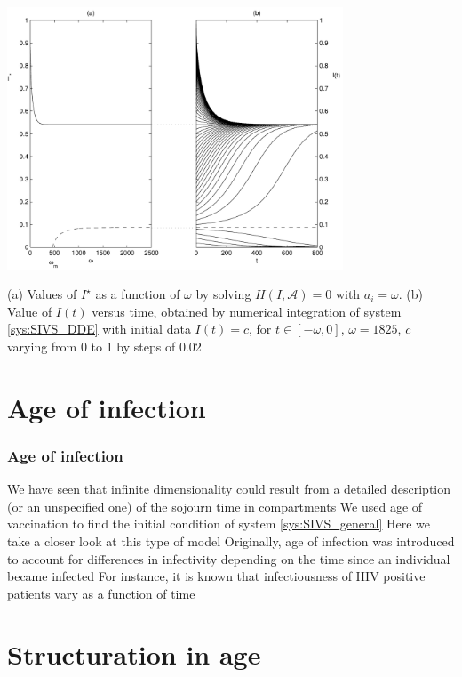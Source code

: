 \documentclass[aspectratio=169]{beamer}\usepackage[]{graphicx}\usepackage[]{xcolor}
\begin{document}
\begin{frame}
\begin{center}
   \includegraphics[width=0.75\textwidth]{FIGS/bif_and_time}
\end{center}
(a) Values of $I^\star$ as a function of $\omega$ by solving $H(I,\mathcal{A})=0$ with $a_i=\omega$. (b) Value of $I(t)$ versus time, obtained by numerical integration of system \eqref{sys:SIVS_DDE} with initial data $I(t)=c$, for $t\in[-\omega,0]$, $\omega=1825$, $c$ varying from 0 to 1 by steps of 0.02
\end{frame}


\section{Age of infection}

\begin{frame}\frametitle{Age of infection}
We have seen that infinite dimensionality could result from a detailed description (or an unspecified one) of the sojourn time in compartments
\vfill
We used age of vaccination to find the initial condition of system \eqref{sys:SIVS_general}
\vfill
Here we take a closer look at this type of model
\vfill
Originally, age of infection was introduced to account for differences in infectivity depending on the time since an individual became infected
\vfill
For instance, it is known that infectiousness of HIV positive patients vary as a function of time
\end{frame}

\section{Structuration in age}
\end{document}
